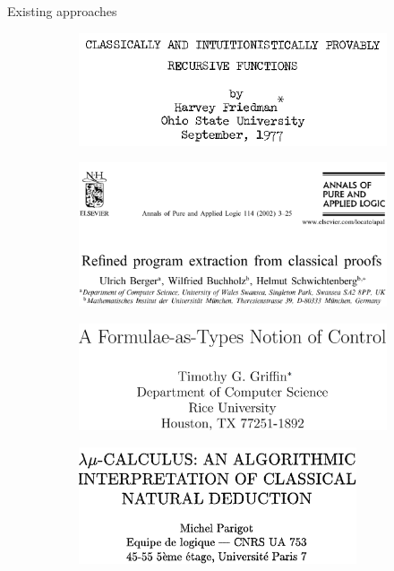 \documentclass{cubeamer}
\begin{document}
	\begin{frame}{Existing approaches}
		\begin{figure}
			\begin{subfigure}{0.49\textwidth}
				\centering
				\includegraphics[width=\textwidth]{friedman.png}
			\end{subfigure}
			\begin{subfigure}{0.49\textwidth}
				\centering
				\includegraphics[width=\textwidth]{schwichtenberg.png}
			\end{subfigure}
		\vspace{.5cm}
			\begin{subfigure}[b]{0.49\textwidth}
				\centering
				\includegraphics[width=\textwidth]{griffin.png}
			\end{subfigure}
			\begin{subfigure}[b]{0.49\textwidth}
				\centering
				\includegraphics[width=0.9\textwidth]{parigot.png}
			\end{subfigure}
		\end{figure}
	\end{frame}
\end{document}
